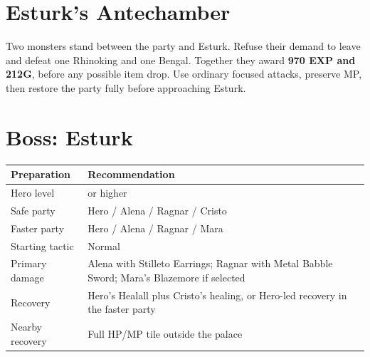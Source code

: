 \documentclass[
  american,
  10pt,
  letterpaper,
  oneside,
  open=any]{scrreprt}
\newcounter{none} %
\newenvironment{guidetable}{%
  \small\setstretch{1.0}%
  \setlength{\tabcolsep}{4pt}%
  \setlength{\LTpre}{8pt}\setlength{\LTpost}{10pt}%
  \renewcommand{\arraystretch}{1.16}%
}{ }
\begin{document}
\section{Esturk's Antechamber}\label{esturks-antechamber}

Two monsters stand between the party and Esturk. Refuse their demand to
leave and defeat one Rhinoking and one Bengal. Together they award
\textbf{970 EXP and 212G}, before any possible item drop. Use ordinary
focused attacks, preserve MP, then restore the party fully before
approaching Esturk.

\section{Boss: Esturk}\label{boss-esturk}

\begin{guidetable}

{\def\LTcaptype{none} %
\begin{longtable}[]{@{}
  >{\raggedright\arraybackslash}p{}
  >{\raggedright\arraybackslash}p{}@{}}
\toprule\noalign{}
\begin{minipage}[b]{\linewidth}\raggedright
\color{GuideGreen}\bfseries Preparation
\end{minipage} & \begin{minipage}[b]{\linewidth}\raggedright
\color{GuideGreen}\bfseries Recommendation
\end{minipage} \\
\midrule\noalign{}
\endhead
\bottomrule\noalign{}
\endlastfoot
Hero level & 32 or higher \\
Safe party & Hero / Alena / Ragnar / Cristo \\
Faster party & Hero / Alena / Ragnar / Mara \\
Starting tactic & Normal \\
Primary damage & Alena with Stilleto Earrings; Ragnar with Metal Babble
Sword; Mara's Blazemore if selected \\
Recovery & Hero's Healall plus Cristo's healing, or Hero-led recovery in
the faster party \\
Nearby recovery & Full HP/MP tile outside the palace \\
\end{longtable}
}

\end{guidetable}
\end{document}
